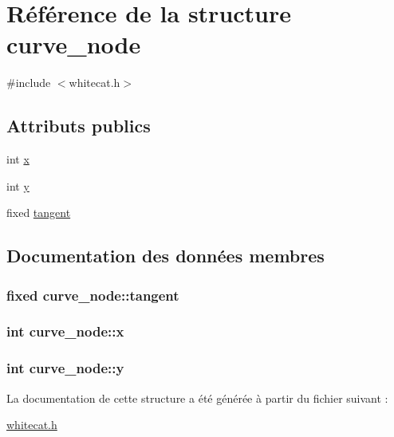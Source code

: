 \hypertarget{structcurve__node}{\section{Référence de la structure curve\-\_\-node}
\label{structcurve__node}
}


{\ttfamily \#include $<$whitecat.\-h$>$}

\subsection*{Attributs publics}
\begin{DoxyCompactItemize}
\item 
int \hyperlink{structcurve__node_aa7ae8f2ee3bbd3e6194785c392751cdb}{x}
\item 
int \hyperlink{structcurve__node_afc1f4f007a920aa79c1f1f0ff0b49465}{y}
\item 
fixed \hyperlink{structcurve__node_a31ea7469070f7bb90ceae073d1d075a6}{tangent}
\end{DoxyCompactItemize}


\subsection{Documentation des données membres}
\hypertarget{structcurve__node_a31ea7469070f7bb90ceae073d1d075a6}{
\subsubsection[{tangent}]{\setlength{\rightskip}{0pt plus 5cm}fixed curve\-\_\-node\-::tangent}}\label{structcurve__node_a31ea7469070f7bb90ceae073d1d075a6}
\hypertarget{structcurve__node_aa7ae8f2ee3bbd3e6194785c392751cdb}{
\subsubsection[{x}]{\setlength{\rightskip}{0pt plus 5cm}int curve\-\_\-node\-::x}}\label{structcurve__node_aa7ae8f2ee3bbd3e6194785c392751cdb}
\hypertarget{structcurve__node_afc1f4f007a920aa79c1f1f0ff0b49465}{
\subsubsection[{y}]{\setlength{\rightskip}{0pt plus 5cm}int curve\-\_\-node\-::y}}\label{structcurve__node_afc1f4f007a920aa79c1f1f0ff0b49465}


La documentation de cette structure a été générée à partir du fichier suivant \-:\begin{DoxyCompactItemize}
\item 
\hyperlink{whitecat_8h}{whitecat.\-h}\end{DoxyCompactItemize}
